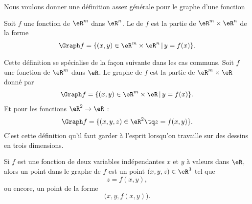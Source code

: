 
Nous voulons donner une définition assez générale pour le graphe d'une fonction
\begin{definition}
  Soit $f$ une fonction de $\eR^m$ dans $\eR^n$. Le  de $f$ est la partie de $\eR^m\times \eR^n$ de la forme
  \begin{equation}
    \Graph f= \{ (x,y)\in \eR^m\times \eR^n \,|\, y=f(x)\}.
  \end{equation}
\end{definition}

Cette définition se spécialise de la façon suivante dans les cas communs. Soit $f$ une fonction de $\eR^m$ dans $\eR$. Le graphe de $f$ est la partie de $\eR^m\times \eR$ donné par
  \begin{equation}
    \Graph f= \{ (x,y)\in \eR^m\times \eR \,|\, y=f(x)\}.
  \end{equation}
  Et pour les fonctions \( \eR^2\to \eR\) :
\begin{equation}
	\Graph f= \{ (x,y,z)\in\eR^2\tq z=f(x,y) \}.
\end{equation}
C'est cette définition qu'il faut garder à l'esprit lorsqu'on travaille sur des dessins en trois dimensions.

Si $f$ est une fonction de deux variables indépendantes $x$ et $y$ à valeurs dans $\eR$, alors un point dans le graphe de $f$ est un point $(x,y,z)\in\eR^3$ tel que
\begin{equation}
	z=f(x,y),
\end{equation}
ou encore, un point de la forme
\begin{equation}
	\big( x,y,f(x,y) \big).
\end{equation}


